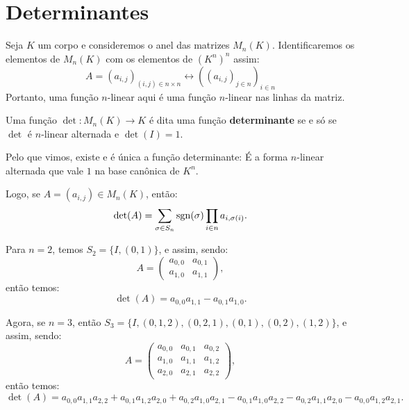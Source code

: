 \documentclass[11pt,twoside,a4paper]{book}
\begin{document}
\section{Determinantes}

Seja $K$ um corpo e consideremos o anel das matrizes $M_n(K)$. Identificaremos os elementos de $M_n(K)$ com os elementos de $(K^n)^n$ assim:
\[
A=(a_{i,j})_{(i,j)\in n\times n}\leftrightarrow ((a_{i,j})_{j\in n})_{i\in n}
\]
Portanto, uma função $n$-linear aqui é uma função $n$-linear nas linhas da matriz.

\begin{definicao}
Uma função $\det:M_n(K)\rightarrow K$ é dita uma função \textbf{determinante} se e só se $\det$ é $n$-linear alternada e $\det(I)=1$.
\end{definicao}

\noindent
Pelo que vimos, existe e é única a função determinante: É a forma $n$-linear alternada que vale $1$ na base canônica de $K^n$.

\medskip
\noindent
Logo, se $A=(a_{i,j})\in M_n(K)$, então:
\[
\det(A)=\sum_{\sigma\in S_n}{\rm sgn}(\sigma)\prod_{i\in n}a_{i,\sigma(i)}.
\]

\begin{exemplo}
Para $n=2$, temos $S_2=\{I,(0,1)\}$, e assim, sendo:
\[
A=\begin{pmatrix}
a_{0,0}&a_{0,1}\\a_{1,0}&a_{1,1}
\end{pmatrix},
\]
então temos:
\[
\det(A)=a_{0,0}a_{1,1}-a_{0,1}a_{1,0}.
\]
\end{exemplo}

\begin{exemplo}
Agora, se $n=3$, então $S_3=\{I,(0,1,2),(0,2,1),(0,1),(0,2),(1,2)\}$, e assim, sendo:
\[
A=\begin{pmatrix}
a_{0,0}&a_{0,1}&a_{0,2}\\a_{1,0}&a_{1,1}&a_{1,2}\\a_{2,0}&a_{2,1}&a_{2,2}
\end{pmatrix},
\]
então temos:
\[
\det(A)=a_{0,0}a_{1,1}a_{2,2}+a_{0,1}a_{1,2}a_{2,0}+a_{0,2}a_{1,0}a_{2,1}-a_{0,1}a_{1,0}a_{2,2}-a_{0,2}a_{1,1}a_{2,0}-a_{0,0}a_{1,2}a_{2,1}.
\]
\end{exemplo}
\end{document}
